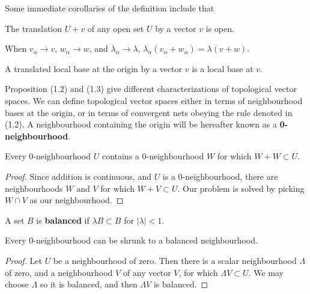 Some immediate corollaries of the definition include that

\begin{prop}
    The translation $U + v$ of any open set $U$ by a vector $v$ is open.
\end{prop}
\begin{prop}
    When $v_\alpha \to v$, $w_\alpha \to w$, and $\lambda_\alpha \to \lambda$, $\lambda_\alpha (v_\alpha + w_\alpha) = \lambda ( v + w)$.
\end{prop}
\begin{prop}
    A translated local base at the origin by a vector $v$ is a local base at $v$.
\end{prop}
%
Proposition (1.2) and (1.3) give different characterizations of topological vector spaces. We can define topological vector spaces either in terms of neighbourhood bases at the origin, or in terms of convergent nets obeying the rule denoted in (1.2). A neighbourhood containing the origin will be hereafter known as a {\bf 0-neighbourhood}.
%
\begin{lemma}
    Every 0-neighbourhood $U$ contains a 0-neighbourhood $W$ for which $W + W \subset U$.
\end{lemma}
\begin{proof}
    Since addition is continuous, and $U$ is a 0-neighbourhood, there are neighbourhoods $W$ and $V$ for which $W + V \subset U$. Our problem is solved by picking $W \cap V$ as our neighbourhood.
\end{proof}

\begin{definition}
    A set $B$ is {\bf balanced} if $\lambda B \subset B$ for $|\lambda| < 1$.
\end{definition}

\begin{lemma}
    Every 0-neighbourhood can be shrunk to a balanced neighbourhood.
\end{lemma}
\begin{proof}
    Let $U$ be a neighbourhood of zero. Then there is a scalar neighbourhood $\Lambda$ of zero, and a neighbourhood $V$ of any vector $V$, for which $\Lambda V \subset U$. We may choose $\Lambda$ so it is balanced, and then $\Lambda V$ is balanced.
\end{proof}

